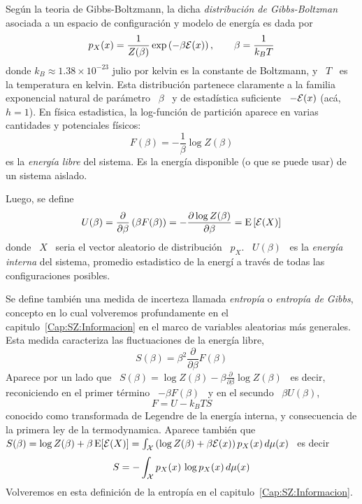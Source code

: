 \begin{ejemplo}
  Seg\'un  la  teoria  de  Gibbs-Boltzmann,  la  dicha  {\em  distribuci\'on  de
    Gibbs-Boltzman}  asociada  a  un  espacio  de configuraci\'on  y  modelo  de
  energ\'ia es dada por
  \[
  p_X(x) = \frac{1}{Z(\beta)}  \exp\left( - \beta \mathcal{E}(x) \right),  \qquad \beta =
  \frac{1}{k_B T}
  \]
  donde $k_B \approx  1.38 \times 10^{-23}$ julio por kelvin  es la constante de
  Boltzmann,  y  \ $T$  \  es la  temperatura  en  kelvin.  Esta  distribuci\'on
  partenece claramente a la familia exponencial natural de par\'ametro \ $\beta$
  \  y de  estad\'istica suficiente  \ $-\mathcal{E}(x)$  (ac\'a, $h  = 1$).  En f\'isica
  estadistica, la  log-funci\'on de partici\'on  aparece en varias  cantidades y
  potenciales f\'isicos:
  \[
  F(\beta) = - \frac{1}{\beta} \log Z(\beta)
  \]
  es la {\em energ\'ia libre} del  sistema. Es la energ\'ia disponible (o que se
  puede usar) de un sistema aislado.

  Luego, se define
  \[
  U(\beta) =  \frac{\partial}{\partial \beta} \left( \beta F(\beta)  \right) = -
  \frac{\partial \log Z(\beta)}{\partial \beta} = \operatorname{E}\left[ \mathcal{E}(X) \right]
  \]
  donde  \  $X$ \  seria  el  vector aleatorio  de  distribuci\'on  \ $p_X$.   \
  $U(\beta)$ \ es  la {\em energ\'ia interna} del  sistema, promedio estadistico
  de la energ\'i a trav\'es de todas las configuraciones posibles.

  Se define  tambi\'en una medida de  incerteza llamada {\em  entrop\'ia} o {\em
    entrop\'ia de  Gibbs}, concepto  en lo cual  volveremos profundamente  en el
  capitulo~\ref{Cap:SZ:Informacion}  en el marco  de variables  aleatorias m\'as
  generales.  Esta medida caracteriza las fluctuaciones de la energ\'ia libre,
  \[
  S(\beta) = \beta^2 \frac{\partial}{\partial \beta} F(\beta)
  \]
  Aparece   por   un  lado   que   \  $S(\beta)   =   \log   Z(\beta)  -   \beta
  \frac{\partial}{\partial \beta} \log Z(\beta)$  \ es decir, reconiciendo en el
  primer t\'ermino \ $- \beta F(\beta)$ \ y en el secundo \ $\beta U(\beta)$,
  \[
  F = U - k_B T S
  \]
  conocido como transformada de Legendre de la energ\'ia interna, y consecuencia
  de la primera ley de la  termodynamica. Aparece tambi\'en que $S(\beta) = \log
  Z(\beta) +  \beta \operatorname{E}[ \mathcal{E}(X) ] =  \int_{\mathcal{X}} \left( \log Z(\beta)  + \beta \mathcal{E}(x)
  \right) p_X(x) \, d\mu(x)$ \ es decir
  \[
  S = - \int_{\mathcal{X}} p_X(x) \, \log p_X(x) \, d\mu(x)
  \]
  Volveremos    en    esta    definici\'on    de    la    entrop\'ia    en    el
  capitulo~\ref{Cap:SZ:Informacion}.
\end{ejemplo}


